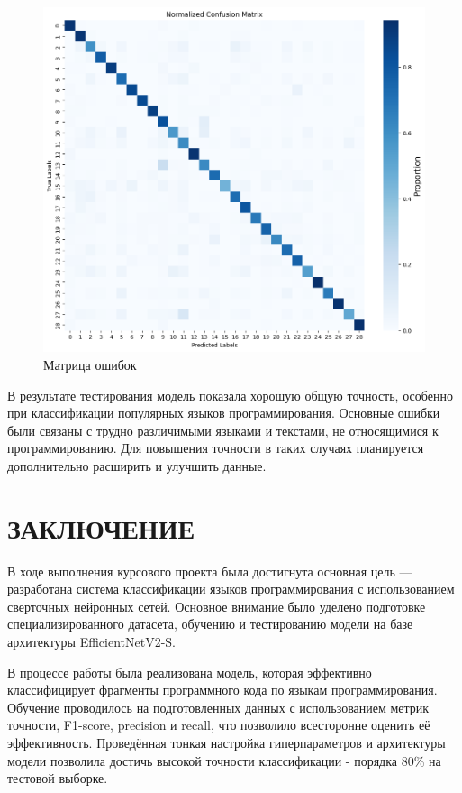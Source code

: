 {\begin{figure}[H]
    \centering
    \includegraphics[width=1\textwidth]{assets/confusion.png} 
    \caption{Матрица ошибок}
\end{figure}

В результате тестирования модель показала хорошую общую точность, особенно при классификации популярных языков программирования. Основные ошибки были связаны с трудно различимыми языками и текстами, не относящимися к программированию. Для повышения точности в таких случаях планируется дополнительно расширить и улучшить данные.
\newpage
\section{\MakeUppercase{Заключение}}
В ходе выполнения курсового проекта была достигнута основная цель — разработана система классификации языков программирования с использованием сверточных нейронных сетей. Основное внимание было уделено подготовке специализированного датасета, обучению и тестированию модели на базе архитектуры EfficientNetV2-S. 

В процессе работы была реализована модель, которая эффективно классифицирует фрагменты программного кода по языкам программирования. Обучение проводилось на подготовленных данных с использованием метрик точности, F1-score, precision и recall, что позволило всесторонне оценить её эффективность. Проведённая тонкая настройка гиперпараметров и архитектуры модели позволила достичь высокой точности классификации - порядка 80\% на тестовой выборке. 

}
